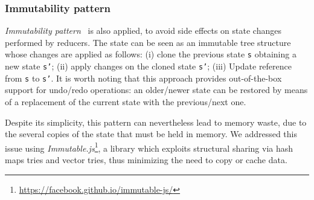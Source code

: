 \subsubsection*{Immutability pattern} \emph{Immutability pattern}~\cite{immutability} is also applied, to avoid side effects on state changes performed by reducers. The state can be seen as an immutable tree structure whose changes are applied as follows: (i) clone the previous state \texttt{s} obtaining a new state \texttt{s'}; (ii) apply changes on the cloned state \texttt{s'}; (iii) Update reference from \texttt{s} to \texttt{s'}. It is worth noting that this approach provides out-of-the-box support for undo/redo operations: an older/newer state can be restored by means of a replacement of the current state with the previous/next one.


Despite its simplicity, this pattern can nevertheless lead to memory waste, due to the several copies of the state that must be held in memory. We addressed this issue using \emph{Immutable.js}\footnote{\url{https://facebook.github.io/immutable-js/}}, a library which exploits structural sharing via hash maps tries and vector tries, thus minimizing the need to copy or cache data.
